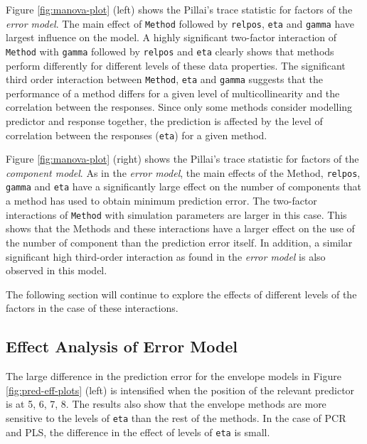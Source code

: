 \documentclass[review]{elsarticle}
\providecommand{\tightlist}{%
  \setlength{\itemsep}{0pt}\setlength{\parskip}{0pt}}
\begin{document}
\begin{description}
\tightlist
\item[Error Model:]
Figure \ref{fig:manova-plot} (left) shows the Pillai's trace statistic for factors of the \emph{error model}. The main effect of \texttt{Method} followed by \texttt{relpos}, \texttt{eta} and \texttt{gamma} have largest influence on the model. A highly significant two-factor interaction of \texttt{Method} with \texttt{gamma} followed by \texttt{relpos} and \texttt{eta} clearly shows that methods perform differently for different levels of these data properties. The significant third order interaction between \texttt{Method}, \texttt{eta} and \texttt{gamma} suggests that the performance of a method differs for a given level of multicollinearity and the correlation between the responses. Since only some methods consider modelling predictor and response together, the prediction is affected by the level of correlation between the responses (\texttt{eta}) for a given method.
\item[Component Model:]
Figure \ref{fig:manova-plot} (right) shows the Pillai's trace statistic for factors of the \emph{component model}. As in the \emph{error model}, the main effects of the Method, \texttt{relpos}, \texttt{gamma} and \texttt{eta} have a significantly large effect on the number of components that a method has used to obtain minimum prediction error. The two-factor interactions of \texttt{Method} with simulation parameters are larger in this case. This shows that the Methods and these interactions have a larger effect on the use of the number of component than the prediction error itself. In addition, a similar significant high third-order interaction as found in the \emph{error model} is also observed in this model.
\end{description}

The following section will continue to explore the effects of different levels of the factors in the case of these interactions.

\hypertarget{effect-analysis-of-error-model}{%
\subsection{Effect Analysis of Error Model}\label{effect-analysis-of-error-model}}

The large difference in the prediction error for the envelope models in Figure \ref{fig:pred-eff-plots} (left) is intensified when the position of the relevant predictor is at 5, 6, 7, 8. The results also show that the envelope methods are more sensitive to the levels of \texttt{eta} than the rest of the methods. In the case of PCR and PLS, the difference in the effect of levels of \texttt{eta} is small.
\end{document}
